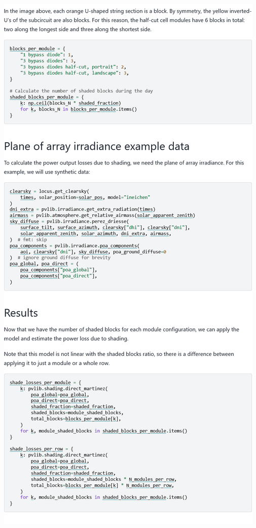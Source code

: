 \begin{myparindent}{0pt}
\includegraphics[width=\linewidth,height=0.9\textheight,keepaspectratio]{images/docs_examples_cut/bypass_diodes_2.png}


\end{myparindent}
